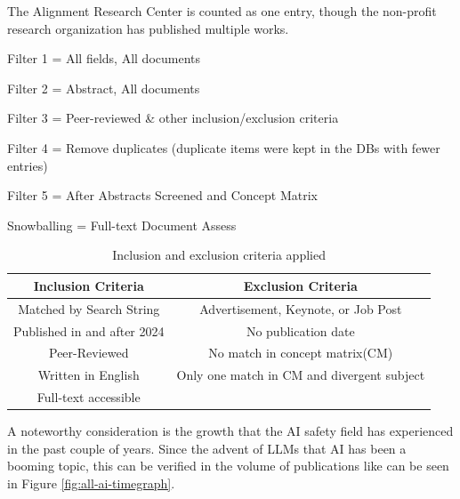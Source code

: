 \begin{toreview}
\begin{table}[htbp]
\begin{threeparttable}
\begin{tabular}{lcccccc}
				\bottomrule
			\end{tabular}
			\begin{tablenotes}
				\small
				\item[*] The Alignment Research Center is counted as one entry, though the non-profit research organization has published multiple works.
				\item Filter 1 = All fields, All documents
				\item Filter 2 = Abstract, All documents
				\item Filter 3 = Peer-reviewed \& other inclusion/exclusion criteria
				\item Filter 4 = Remove duplicates (duplicate items were kept in the DBs with fewer entries)
				\item Filter 5 = After Abstracts Screened and Concept Matrix
				\item Snowballing = Full-text Document Assess
			\end{tablenotes}
		\end{threeparttable}
	\end{table}

	\begin{table}[htbp]
		\centering
		\caption{Inclusion and exclusion criteria applied}
		\label{tab:inclusion_exclusion_criteria}
		\begin{tabular}{c c}
			\toprule
			\textbf{Inclusion Criteria} & \textbf{Exclusion Criteria}                \\
			\midrule
			Matched by Search String    & Advertisement, Keynote, or Job Post        \\
			Published in and after 2024 & No publication date                        \\
			Peer-Reviewed               & No match in concept matrix(CM)             \\
			Written in English          & Only one match in CM and divergent subject \\
			Full-text accessible        &                                            \\
			\bottomrule
		\end{tabular}
	\end{table}

\end{toreview}

A noteworthy consideration is the growth that the AI safety field has experienced in the past couple of years. Since the advent of LLMs that AI has been a booming topic, this can be verified in the volume of publications like can be seen in Figure \ref{fig:all-ai-timegraph}.


